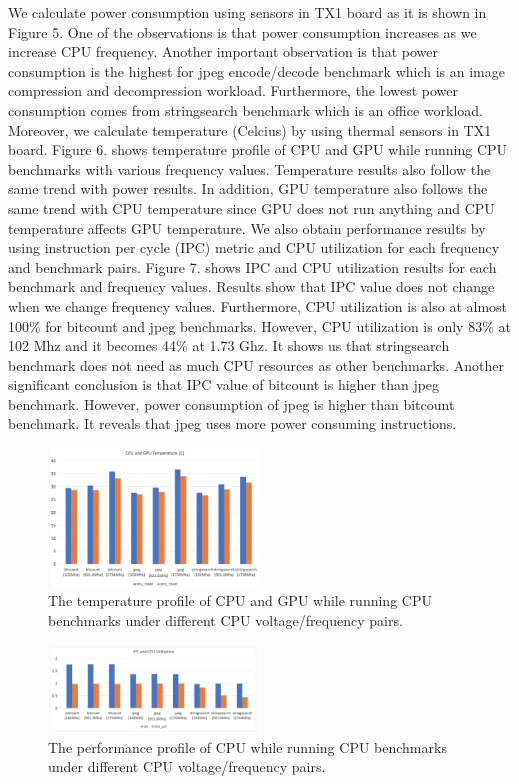 We calculate power consumption using sensors in TX1 board as it is shown in Figure 5. One of the observations is that power consumption increases as we increase CPU frequency. Another important observation is that power consumption is the highest for jpeg encode/decode benchmark which is an image compression and decompression workload. Furthermore, the lowest power consumption comes from stringsearch benchmark which is an office workload. 
Moreover, we calculate temperature (Celcius) by using thermal sensors in TX1 board. Figure 6. shows temperature profile of CPU and GPU while running CPU benchmarks with various frequency values. Temperature results also follow the same trend with power results. In addition, GPU temperature also follows the same trend with CPU temperature since GPU does not run anything and CPU temperature affects GPU temperature. 
We also obtain performance results by using instruction per cycle (IPC) metric and CPU utilization for each frequency and benchmark pairs. Figure 7. shows IPC and CPU utilization results for each benchmark and frequency values. Results show that IPC value does not change when we change frequency values. Furthermore, CPU utilization is also at almost 100\% for bitcount and jpeg benchmarks. However, CPU utilization is only 83\% at 102 Mhz and it becomes 44\% at 1.73 Ghz. It shows us that stringsearch benchmark does not need as much CPU resources as other benchmarks. 
Another significant conclusion is that IPC value of bitcount is higher than jpeg benchmark. However, power consumption of jpeg is higher than bitcount benchmark. It reveals that jpeg uses more power consuming instructions.


\begin{figure}[h]
    \centering
    \includegraphics[width=0.5\textwidth]{cputemp.png}
    \caption{The temperature profile of CPU and GPU while running CPU benchmarks under different CPU voltage/frequency pairs.}\label{fig:cputemp}
\end{figure}


\begin{figure}[h]
    \centering
    \includegraphics[width=0.5\textwidth]{cpuipc.png}
    \caption{The performance profile of CPU while running CPU benchmarks under different CPU voltage/frequency pairs.}\label{fig:cpuperf}
\end{figure}

